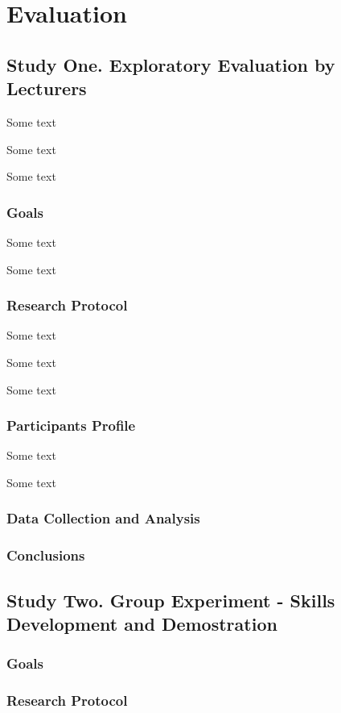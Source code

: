 \chapter{Evaluation\label{cha:evaluation}}

\section{Study One. Exploratory Evaluation by Lecturers}

Some text

Some text

Some text

\subsection{Goals}

Some text

Some text

\subsection{Research Protocol}
Some text

Some text

Some text

\subsection{Participants Profile}
Some text

Some text

\subsection{Data Collection and Analysis}
\subsection{Conclusions}
 
\section{Study Two. Group Experiment - \LLLc Skills Development and
Demostration}
\subsection{Goals}
\subsection{Research Protocol}
